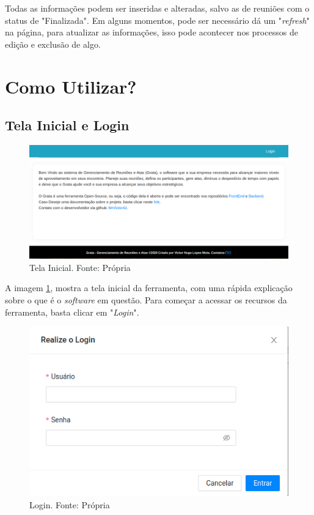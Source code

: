 Todas as informações podem ser inseridas e alteradas, salvo as de reuniões com o status de "Finalizada". Em alguns momentos, pode ser necessário dá um "\textit{refresh}" na página, para atualizar as informações, isso pode acontecer nos processos de edição e exclusão de algo.

\section{Como Utilizar?}

\subsection{Tela Inicial e Login}

\begin{figure}[H]
    \centering
    \includegraphics[width=1.0\textwidth]{figuras/tela_inicial.png}
    \caption{Tela Inicial. Fonte: Própria}
    \label{img:tela_inicial}
\end{figure}

A imagem \ref{img:tela_inicial}, mostra a tela inicial da ferramenta, com uma rápida explicação sobre o que é o \textit{software} em questão. Para começar a acessar os recursos da ferramenta, basta clicar em "\textit{Login}".

\begin{figure}[H]
    \centering
    \includegraphics[width=1.0\textwidth]{figuras/tela_login.png}
    \caption{Login. Fonte: Própria}
    \label{img:tela_login}
\end{figure}

